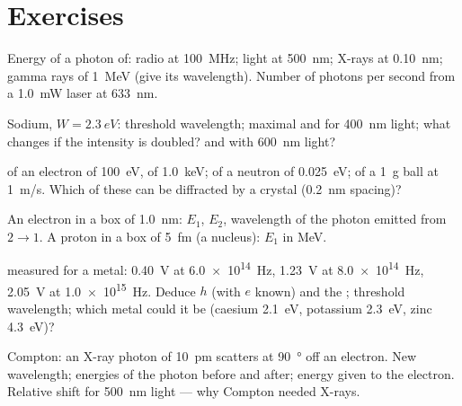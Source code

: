 \section{Exercises}

\begin{exercise}[$\star$]\label{exo:b1:quantum-introduction:1}
Energy of a photon of: radio at \qty{100}{MHz}; light at \qty{500}{nm};
X-rays at \qty{0.10}{nm}; gamma rays of \qty{1}{MeV} (give its
wavelength). Number of photons per second from a \qty{1.0}{mW} laser at
\qty{633}{nm}.
\end{exercise}

\begin{exercise}[$\star$]\label{exo:b1:quantum-introduction:2}
Sodium, $W = \qty{2.3}{eV}$: threshold wavelength; maximal 
and  for \qty{400}{nm} light; what changes if the
intensity is doubled? and with \qty{600}{nm} light?
\end{exercise}

\begin{exercise}[$\star$]\label{exo:b1:quantum-introduction:3}
 of an electron of \qty{100}{eV}, of \qty{1.0}{keV};
of a neutron of \qty{0.025}{eV}; of a \qty{1}{g} ball at \qty{1}{m/s}.
Which of these can be diffracted by a crystal (\qty{0.2}{nm} spacing)?
\end{exercise}

\begin{exercise}[$\star$]\label{exo:b1:quantum-introduction:4}
An electron in a box of \qty{1.0}{nm}: $E_1$, $E_2$, wavelength of the
photon emitted from $2 \to 1$. A proton in a box of \qty{5}{fm}
(a nucleus): $E_1$ in \unit{MeV}.
\end{exercise}

\begin{exercise}[$\star\star$]\label{exo:b1:quantum-introduction:5}
 measured for a metal: \qty{0.40}{V} at
\qty{6.0e14}{Hz}, \qty{1.23}{V} at \qty{8.0e14}{Hz}, \qty{2.05}{V} at
\qty{1.0e15}{Hz}. Deduce $h$ (with $e$ known) and the ;
threshold wavelength; which metal could it be (caesium \qty{2.1}{eV},
potassium \qty{2.3}{eV}, zinc \qty{4.3}{eV})?
\end{exercise}

\begin{exercise}[$\star\star$]\label{exo:b1:quantum-introduction:6}
Compton: an X-ray photon of \qty{10}{pm} scatters at \qty{90}{\degree} off an
electron. New wavelength; energies of the photon before and after; energy
given to the electron. Relative shift for \qty{500}{nm} light --- why
Compton needed X-rays.
\end{exercise}

